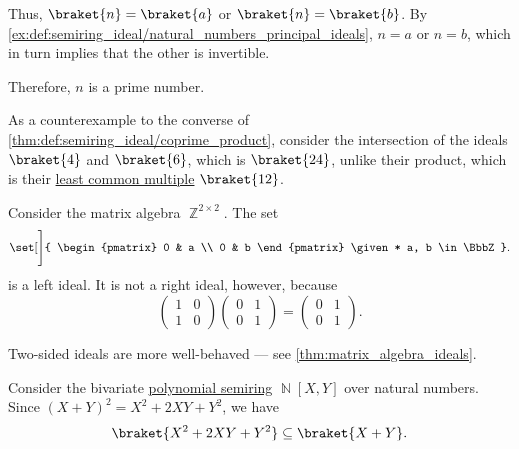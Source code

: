 \begin{example}
\begin{thmenum}
    Thus, \( \braket{ n } = \braket{ a } \) or \( \braket{ n } = \braket{ b } \). By \cref{ex:def:semiring_ideal/natural_numbers_principal_ideals}, \( n = a \) or \( n = b \), which in turn implies that the other is invertible.

    Therefore, \( n \) is a prime number.

     As a counterexample to the converse of \cref{thm:def:semiring_ideal/coprime_product}, consider the intersection of the ideals \( \braket{ 4 } \) and \( \braket{ 6 } \), which is \( \braket{ 24 } \), unlike their product, which is their \hyperref[def:lcm]{least common multiple} \( \braket{ 12 } \).

     Consider the matrix algebra \( \BbbZ^{2 \times 2} \). The set
    \begin{equation*}
      \set[\Bigg]
      {
        \begin{pmatrix}
          0 & a \\
          0 & b
        \end{pmatrix}
        \given*
        a, b \in \BbbZ
      }.
    \end{equation*}
    is a left ideal. It is not a right ideal, however, because
    \begin{equation*}
      \begin{pmatrix}
        1 & 0 \\
        1 & 0
      \end{pmatrix}
      \begin{pmatrix}
        0 & 1 \\
        0 & 1
      \end{pmatrix}
      =
      \begin{pmatrix}
        0 & 1 \\
        0 & 1
      \end{pmatrix}.
    \end{equation*}

    Two-sided ideals are more well-behaved --- see \cref{thm:matrix_algebra_ideals}.

     Consider the bivariate \hyperref[def:polynomial_algebra]{polynomial semiring} \( \BbbN[X, Y] \) over natural numbers. Since \( (X + Y)^2 = X^2 + 2XY + Y^2 \), we have
    \begin{equation*}
      \braket{ X^2 + 2XY + Y^2 } \subseteq \braket{ X + Y }.
    \end{equation*}


\end{thmenum}
\end{example}
